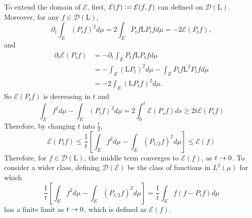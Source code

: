 \begin{enumerate}[label=\arabic{*}.]
	To extend the domain of $\mathcal{E}$, first, $\mathcal{E}(f) \vcentcolon= \mathcal{E}(f,f)$ can defined on $\mathcal{D}(\mathrm{L})$. Moreover, for any $f \in \mathcal{D}(\mathrm{L})$,
	\begin{equation*}
	    \partial_t \int_E(P_tf)^2 d\mu = 2 \int_E P_tf\mathrm{L}P_tf d\mu = -2\mathcal{E}(P_tf),
	\end{equation*}
	and
	\begin{equation*}
	    \begin{aligned}
			\partial_t \mathcal{E}\left(P_t f\right) & =-\partial_t \int_E P_t f \mathrm{L} P_t f d \mu \\
			& =-\int_E\left(\mathrm{L} P_t\right)^2 d \mu-\int_E P_t f \mathrm{L}^2 P_t f d \mu \\
			& =-2 \int_E\left(\mathrm{L} P_t f\right)^2 d \mu.
		\end{aligned}
	\end{equation*}
	So $\mathcal{E}(P_tf)$ is decreasing in $t$ and
	\begin{equation*}
	    \int_E f^2 d \mu-\int_E\left(P_t f\right)^2 d \mu=2 \int_0^t \mathcal{E}\left(P_s f\right) d s \geq 2 t \mathcal{E}\left(P_t f\right)
	\end{equation*}
	Therefore, by changing $t$ into $\frac{t}{2}$,
	\begin{equation*}
	    \mathcal{E}(P_tf) \leq \frac{1}{t}\left[\int_E f^2 d \mu-\int_E\left(P_{t / 2} f\right)^2 d \mu\right] \leq \mathcal{E}(f)
	\end{equation*}
	Therefore, for $f \in \mathcal{D}(\mathrm{L})$, the middle term converges to $\mathcal{E}(f)$, as $t \rightarrow 0$. To consider a wider class, defining $\mathcal{D}(\mathcal{E})$ be the class of functions in $L^2(\mu)$ for which 
	\begin{equation*}
	    \frac{1}{t}\left[\int_E f^2 d \mu-\int_E\left(P_{t / 2} f\right)^2 d \mu\right]=\frac{1}{t} \int_E f\left(f-P_t f\right) d \mu
	\end{equation*}
	has a finite limit as $t \rightarrow 0$, which is defined as $\mathcal{E}(f)$.


\end{enumerate}
